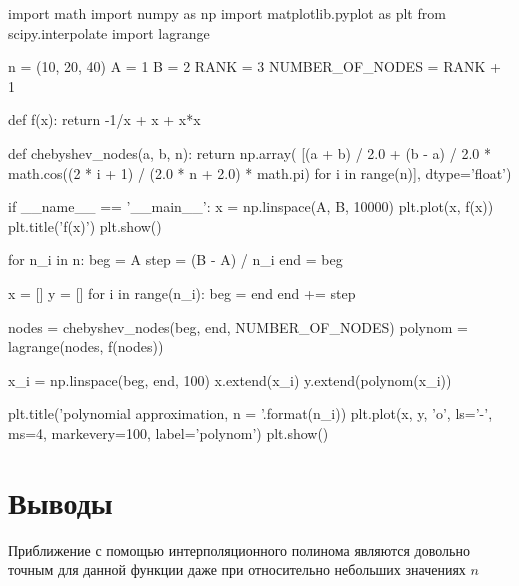 \documentclass{article}
\begin{document}
\begin{python}
import math
import numpy as np
import matplotlib.pyplot as plt
from scipy.interpolate import lagrange

n = (10, 20, 40)
A = 1
B = 2
RANK = 3
NUMBER_OF_NODES = RANK + 1


def f(x):
return -1/x + x + x*x


def chebyshev_nodes(a, b, n):
return np.array(
[(a + b) / 2.0 + (b - a) / 2.0 * math.cos((2 * i + 1) / (2.0 * n + 2.0) * math.pi)
for i in range(n)], dtype='float')


if __name__ == '__main__':
x = np.linspace(A, B, 10000)
plt.plot(x, f(x))
plt.title('f(x)')
plt.show()

for n_i in n:
beg = A
step = (B - A) / n_i
end = beg

x = []
y = []
for i in range(n_i):
beg = end
end += step

nodes = chebyshev_nodes(beg, end, NUMBER_OF_NODES)
polynom = lagrange(nodes, f(nodes))

x_i = np.linspace(beg, end, 100)
x.extend(x_i)
y.extend(polynom(x_i))

plt.title('polynomial approximation, n = {}'.format(n_i))
plt.plot(x, y, 'o', ls='-', ms=4, markevery=100, label='polynom')
plt.show()


\end{python}

\section{Выводы}

Приближение с помощью интерполяционного полинома являются довольно точным для данной функции даже при относительно небольших значениях $n$
\end{document}
